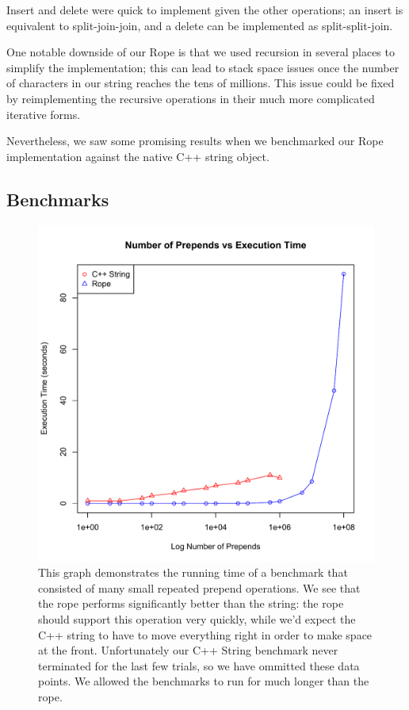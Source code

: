 \documentclass[12pt]{article}
\begin{document}
Insert and delete were quick to implement given the other operations; an insert is equivalent to split-join-join, and a delete can be implemented as split-split-join.

One notable downside of our Rope is that we used recursion in several places to simplify the implementation; this can lead to stack space issues once the number of characters in our string reaches the tens of millions. This issue could be fixed by reimplementing the recursive operations in their much more complicated iterative forms.

Nevertheless, we saw some promising results when we benchmarked our Rope implementation against the native C++ string object.
\newpage
\subsection{Benchmarks}

\begin{figure}[p]
\begin{centering}
\includegraphics[scale=1.0]{prepends_vs_execution}
\caption{This graph demonstrates the running time of a benchmark that consisted of many small repeated prepend operations. We see that the rope performs significantly better than the string: the rope should support this operation very quickly, while we'd expect the C++ string to have to move everything right in order to make space at the front. Unfortunately our C++ String benchmark never terminated for the last few trials, so we have ommitted these data points. We allowed the benchmarks to run for much longer than the rope.}

\end{centering}
\end{figure}
\end{document}

